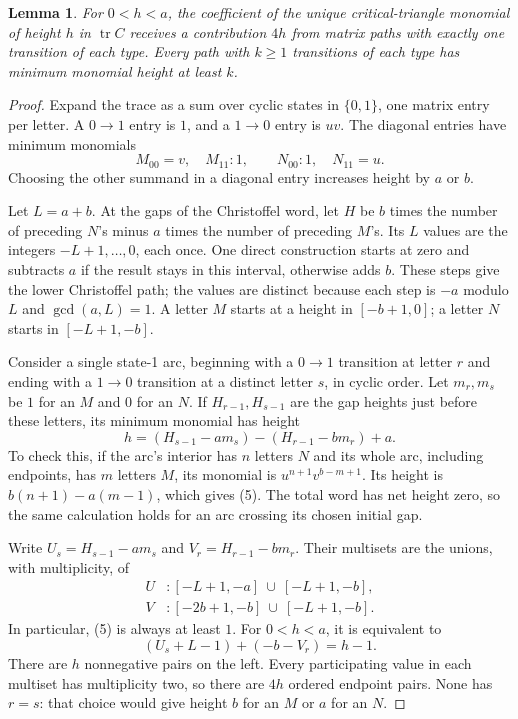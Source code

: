 \documentclass[11pt]{article}
\newtheorem{lemma}{Lemma}
\newcommand{\tr}{\operatorname{tr}}
\begin{document}
\begin{lemma}\label{count}
For $0<h<a$, the coefficient of the unique critical-triangle
monomial of height $h$ in $\tr C$ receives a contribution $4h$
from matrix paths with exactly one transition of each type.
Every path with $k\geq1$ transitions of each type has minimum
monomial height at least $k$.
\end{lemma}
\begin{proof}
Expand the trace as a sum over cyclic states in $\{0,1\}$, one
matrix entry per letter. A $0\to1$ entry is $1$, and a $1\to0$
entry is $uv$. The diagonal entries have minimum monomials
\[
 M_{00}=v,\quad M_{11}:1,\qquad
 N_{00}:1,\quad N_{11}=u.
 \tag{4}
\]
Choosing the other summand in a diagonal entry increases height by
$a$ or $b$.

Let $L=a+b$. At the gaps of the Christoffel word, let $H$ be
$b$ times the number of preceding $N$'s minus $a$ times the number
of preceding $M$'s. Its $L$ values are the integers
$-L+1,\ldots,0$, each once. One direct construction starts at zero
and subtracts $a$ if the result stays in this interval, otherwise
adds $b$. These steps give the lower Christoffel path; the values
are distinct because each step is $-a$ modulo $L$ and
$\gcd(a,L)=1$. A letter $M$ starts at a height in $[-b+1,0]$;
a letter $N$ starts in $[-L+1,-b]$.

Consider a single state-1 arc, beginning with a $0\to1$ transition
at letter $r$ and ending with a $1\to0$ transition at a distinct
letter $s$, in cyclic order. Let $m_r,m_s$ be $1$ for an $M$
and $0$ for an $N$. If $H_{r-1},H_{s-1}$ are the gap heights just
before these letters, its minimum monomial has height
\[
 h=(H_{s-1}-a m_s)-(H_{r-1}-b m_r)+a.
 \tag{5}
\]
To check this, if the arc's interior has $n$ letters $N$ and its
whole arc, including endpoints, has $m$ letters $M$, its monomial
is $u^{n+1}v^{b-m+1}$. Its height is $b(n+1)-a(m-1)$,
which gives (5). The total word has net height zero, so the same
calculation holds for an arc crossing its chosen initial gap.

Write $U_s=H_{s-1}-a m_s$ and $V_r=H_{r-1}-b m_r$.
Their multisets are the unions, with multiplicity, of
\[
\begin{split}
 U &: [-L+1,-a]\ \cup\ [-L+1,-b],\\
 V &: [-2b+1,-b]\ \cup\ [-L+1,-b].
\end{split}
 \tag{6}
\]
In particular, (5) is always at least $1$. For $0<h<a$, it is
equivalent to
\[
 (U_s+L-1)+(-b-V_r)=h-1.
\]
There are $h$ nonnegative pairs on the left. Every participating
value in each multiset has multiplicity two, so there are $4h$
ordered endpoint pairs. None has $r=s$: that choice would give
height $b$ for an $M$ or $a$ for an $N$.


\end{proof}
\end{document}
